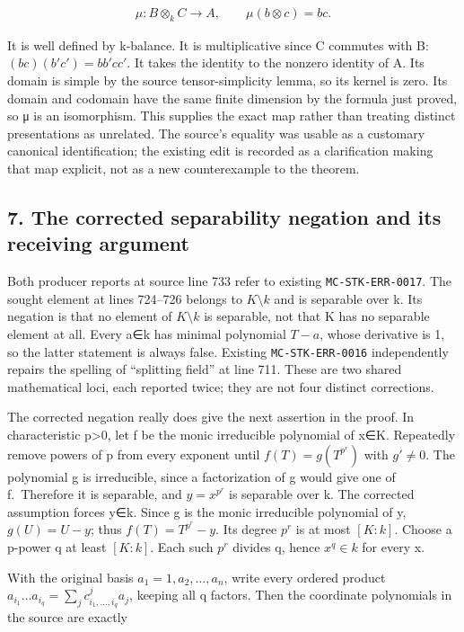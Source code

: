 \documentclass[11pt]{article}
\begin{document}
\[\begin{gathered}
\mu :B\otimes _{k} C\to A,\qquad \mu (b\otimes c)=bc.
\end{gathered}\]

It is well defined by k-balance. It is multiplicative since C commutes with B: \((bc)(b'c')=bb'cc'\). It takes the identity to the nonzero identity of A. Its domain is simple by the source tensor-simplicity lemma, so its kernel is zero. Its domain and codomain have the same finite dimension by the formula just proved, so μ is an isomorphism. This supplies the exact map rather than treating distinct presentations as unrelated. The source's equality was usable as a customary canonical identification; the existing edit is recorded as a clarification making that map explicit, not as a new counterexample to the theorem.

\subsection{7. The corrected separability negation and its receiving argument}\label{the-corrected-separability-negation-and-its-receiving-argument}

Both producer reports at source line 733 refer to existing \texttt{MC-STK-ERR-0017}. The sought element at lines 724--726 belongs to \(K\setminus k\) and is separable over k. Its negation is that no element of \(K\setminus k\) is separable, not that K has no separable element at all. Every a∈k has minimal polynomial \(T-a\), whose derivative is 1, so the latter statement is always false. Existing \texttt{MC-STK-ERR-0016} independently repairs the spelling of ``splitting field'' at line 711. These are two shared mathematical loci, each reported twice; they are not four distinct corrections.

The corrected negation really does give the next assertion in the proof. In characteristic p\textgreater0, let f be the monic irreducible polynomial of x∈K. Repeatedly remove powers of p from every exponent until \(f(T)=g(T^{p^r})\) with \(g'\ne 0\). The polynomial g is irreducible, since a factorization of g would give one of f.~Therefore it is separable, and \(y=x^{p^r}\) is separable over k. The corrected assumption forces y∈k. Since g is the monic irreducible polynomial of y, \(g(U)=U-y\); thus \(f(T)=T^{p^r}-y\). Its degree \(p^r\) is at most \([K:k]\). Choose a p-power q at least \([K:k]\). Each such \(p^r\) divides q, hence \(x^q\in k\) for every x.

With the original basis \(a_{1}=1,a_{2},\ldots ,a_{n}\), write every ordered product \(a_{i_{1}}\ldots a_{i_{q}}=\sum _{j} c^j_{i_{1},\ldots ,i_{q}}a_{j}\), keeping all q factors. Then the coordinate polynomials in the source are exactly
\end{document}
